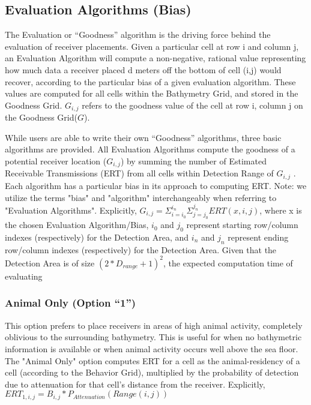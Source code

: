 \subsection{Evaluation Algorithms (Bias)}
The Evaluation or “Goodness” algorithm is the driving force behind the evaluation of receiver placements.  Given a particular cell at row i and column j, an Evaluation Algorithm will compute a non-negative, rational value representing how much data a receiver placed d meters off the bottom of cell (i,j) would recover, according to the particular bias of a given evaluation algorithm.  These values are computed for all cells within the Bathymetry Grid, and stored in the Goodness Grid.  $G_{i,j}$ refers to the goodness value of the cell at row i, column j on the Goodness Grid($G$).  

While users are able to write their own “Goodness” algorithms, three basic algorithms are provided.  All Evaluation Algorithms compute the goodness of a potential receiver location ($G_{i,j}$) by summing the number of Estimated Receivable Transmissions (ERT) from all cells within Detection Range of $G_{i,j}$ .  Each algorithm has a particular bias in its approach to computing ERT.  Note: we utilize the terms "bias" and "algorithm" interchangeably when referring to "Evaluation Algorithms".\newline
\newline
Explicitly, $G_{i,j} = \Sigma_{i=i_0}^{i_n} \Sigma_{j=j_0}^{j_n} ERT(x,i,j)$, where x is the chosen Evaluation Algorithm/Bias, $i_0$ and $j_0$ represent starting row/column indexes (respectively) for the Detection Area, and $i_n$ and $j_n$ represent ending row/column indexes (respectively) for the Detection Area.  Given that the Detection Area is of size $(2*D_{range}+1)^2$, the expected computation time of evaluating

\subsubsection{Animal Only (Option “1”)}
\label{bias1}
This option prefers to place receivers in areas of high animal activity, completely oblivious to the surrounding bathymetry.  This is useful for when no bathymetric information is available or when animal activity occurs well above the sea floor.   The "Animal Only" option computes ERT for a cell as the animal-residency of a cell (according to the Behavior Grid), multiplied by the probability of detection due to attenuation for that cell's distance from the receiver.\newline
Explicitly,
$ERT_{1,i,j} = B_{i,j} * P_{Attenuation}(Range(i,j))$

